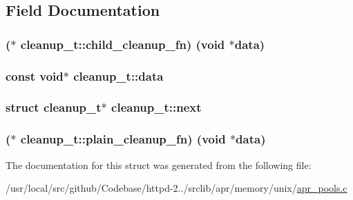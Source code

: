 \subsection{Field Documentation}
\subsubsection[{\texorpdfstring{child\+\_\+cleanup\+\_\+fn}{child_cleanup_fn}}]{($\ast$ cleanup\+\_\+t\+::child\+\_\+cleanup\+\_\+fn) ({\bf void} $\ast${\bf data})}\hypertarget{structcleanup__t_a4c075b302ddf5ffcb7b87925de6696cf}{}\label{structcleanup__t_a4c075b302ddf5ffcb7b87925de6696cf}
\subsubsection[{\texorpdfstring{data}{data}}]{\setlength{\rightskip}{0pt plus 5cm}const {\bf void}$\ast$ cleanup\+\_\+t\+::data}\hypertarget{structcleanup__t_a7c8b8dee1d7c264d9860ccd68465fcb0}{}\label{structcleanup__t_a7c8b8dee1d7c264d9860ccd68465fcb0}
\subsubsection[{\texorpdfstring{next}{next}}]{\setlength{\rightskip}{0pt plus 5cm}struct {\bf cleanup\+\_\+t}$\ast$ cleanup\+\_\+t\+::next}\hypertarget{structcleanup__t_a78e761e1c531239a90eb71bc81d38082}{}\label{structcleanup__t_a78e761e1c531239a90eb71bc81d38082}
\subsubsection[{\texorpdfstring{plain\+\_\+cleanup\+\_\+fn}{plain_cleanup_fn}}]{($\ast$ cleanup\+\_\+t\+::plain\+\_\+cleanup\+\_\+fn) ({\bf void} $\ast${\bf data})}\hypertarget{structcleanup__t_a531f15aade37140e093acaaa1a040bc2}{}\label{structcleanup__t_a531f15aade37140e093acaaa1a040bc2}


The documentation for this struct was generated from the following file\+:\begin{DoxyCompactItemize}
\item 
/usr/local/src/github/\+Codebase/httpd-\/2../srclib/apr/memory/unix/\hyperlink{apr__pools_8c}{apr\+\_\+pools.\+c}\end{DoxyCompactItemize}
